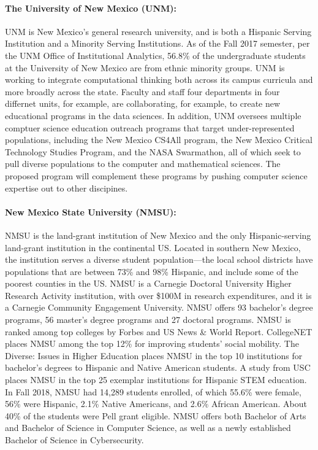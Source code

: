 \paragraph{The University of New Mexico (UNM):}
UNM is New Mexico's general research university, and is both a Hispanic Serving Institution and a Minority Serving Institutions. As of the Fall 2017 semester, per the UNM Office of Institutional Analytics, 56.8\% of the undergraduate students at the University of New Mexico are from ethnic minority groups. UNM is working to integrate computational thinking both across its campus curricula and more broadly across the state. Faculty and staff four departments in four differnet units, for example, are collaborating, for example, to create new educational programs in the data sciences. In addition, UNM oversees multiple comptuer science education outreach programs that target under-represented populations, including  the New Mexico CS4All program, the New Mexico Critical Technology Studies Program, and the NASA Swarmathon, all of which seek to pull diverse populations to the computer and mathematical sciences. The proposed program will complement these programs by pushing computer science expertise out to other discipines. 

\paragraph{New Mexico State University (NMSU):}
NMSU is the land-grant institution of New Mexico and the only Hispanic-serving land-grant institution in the continental US. Located in southern New Mexico, the institution serves a diverse student population---the local school districts have populations that are between 73\% and 98\% Hispanic, and include some of
the poorest counties in the US. NMSU is a Carnegie Doctoral University Higher Research Activity institution, with over \$100M in research expenditures, and it is a Carnegie Community Engagement University. NMSU offers 93 bachelor's degree programs, 56 master's degree programs and 27 doctoral programs. NMSU is ranked among top colleges by Forbes and US News \& World Report. CollegeNET places NMSU among the top 12\% for improving students’ social mobility. The Diverse: Issues in Higher Education places NMSU
in the top 10 institutions for bachelor’s degrees to Hispanic and Native American students. A study from USC places NMSU in the top 25 exemplar institutions for Hispanic STEM education.
In Fall 2018, NMSU had 14,289 students enrolled, of which 55.6\% were female, 56\% were Hispanic, 2.1\%
Native Americans, and 2.6\% African American. About 40\% of the students were Pell grant eligible.
NMSU offers both Bachelor of Arts and Bachelor of Science in Computer Science, as well as a newly established Bachelor of Science in Cybersecurity.  

